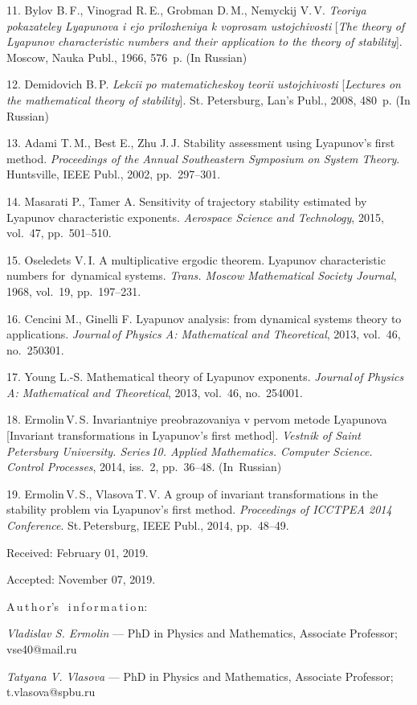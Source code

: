 {11. Bylov B.\,F., Vinograd R.\,E., Grobman D.\,M.,        %
Nemyckij V.\,V. \textit{Teoriya pokazateley Lyapunova i ejo
prilozheniya k voprosam ustojchivosti} [\textit{The theory of
Lyapunov char\-acter\-is\-tic numbers and their application to the
theory of stability}]. Moscow, Nauka Publ., 1966, 576~p. (In
Russian)

12. Demidovich B.\,P. \textit{Lekcii po              %
matematicheskoy teorii ustojchivosti} [\textit{Lectures on the
ma\-the\-ma\-ti\-cal theory of stability}]. St. Petersburg, Lan's
Publ., 2008, 480~p. (In Russian)

13. Adami T.\,M., Best E., Zhu J.\,J. Stability          %
assessment using Lyapunov's first method.   \textit{Proceedings of
the Annual Southeastern Symposium on System Theory}. Huntsville,
IEEE Publ., 2002, pp.~297--301.

14. Masarati P., Tamer A. Sensitivity of              %
trajectory stability estimated by Lyapunov char\-acter\-is\-tic
exponents. \textit{Aerospace Science and Technology}, 2015,
vol.~47, pp.~501--510.

15. Oseledets V.\,I. A multiplicative ergodic        %
theorem. Lyapunov characteristic numbers for~dynamical systems.
\textit{Trans. Moscow Mathematical Society Journal}, 1968,
vol.~19, pp.~197--231.

16. Cencini M., Ginelli F. Lyapunov              %
analysis: from dynamical systems theory to appli\-ca\-tions.
\textit{Journal\,of Physics A: Mathematical and Theoretical},
2013, vol.~46, no.~250301.

17. Young L.-S. Mathematical theory of Lyapunov            %
exponents. \textit{Journal\,of Physics A: Mathe\-ma\-ti\-cal and
Theoretical}, 2013, vol.~46, no.~254001.

18. Ermolin\,V.\,S. Invariantniye                    %
preobrazovaniya v pervom metode Lyapunova [Invariant
trans\-for\-ma\-tions in Lyapunov's first method]. \textit{Vestnik
of Saint\,Petersburg University. Series\,10. Applied
Ma\-the\-ma\-tics. Computer Science. Control Processes}, 2014,
iss.~2, pp.~36--48. (In~Russian)

19. Ermolin\,V.\,S., Vlasova\,T.\,V. A         %
group of invariant transformations in the stability prob\-lem via
Lyapunov's  first  method.  \textit{Proceedings  of  ICCTPEA 2014
 Conference}. St.\,Petersburg, IEEE Publ., 2014, pp.~48--49.


\vskip 1.5mm

%


Received:  February 01, 2019.

Accepted: November 07, 2019.

\vskip 4.5mm%
A\,u\,t\,h\,o\,r's \ i\,n\,f\,o\,r\,m\,a\,t\,i\,o\,n:

\vskip 1.5mm%
\textit{Vladislav S. Ermolin} --- PhD in Physics and Mathematics,
Associate Professor; vse40@mail.ru

\vskip 1.5mm%
\textit{Tatyana V. Vlasova} --- PhD in Physics and Mathematics,
Associate Professor; t.vlasova@spbu.ru

}

